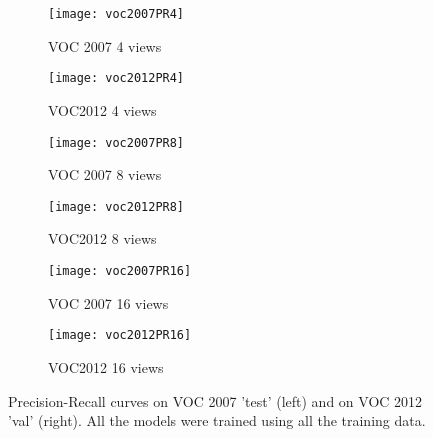 \begin{figure}
\begin{center}
        \begin{subfigure}[b]{0.49\textwidth}
                \texttt{[image: voc2007PR4]}
               	\caption{VOC 2007 4 views}
        \end{subfigure}
        \begin{subfigure}[b]{0.49\textwidth}
                \texttt{[image: voc2012PR4]}
                \caption{VOC2012 4 views}
        \end{subfigure}
        \begin{subfigure}[b]{0.49\textwidth}
                \texttt{[image: voc2007PR8]}
               	\caption{VOC 2007 8 views}
        \end{subfigure}
        \begin{subfigure}[b]{0.49\textwidth}
                \texttt{[image: voc2012PR8]}
                \caption{VOC2012 8 views}
        \end{subfigure}
        \begin{subfigure}[b]{0.49\textwidth}
                \texttt{[image: voc2007PR16]}
               	\caption{VOC 2007 16 views}
        \end{subfigure}
        \begin{subfigure}[b]{0.49\textwidth}
                \texttt{[image: voc2012PR16]}
                \caption{VOC2012 16 views}
        \end{subfigure}        
\caption{Precision-Recall curves on VOC 2007 'test' (left) and on VOC 2012 'val' (right).  All the models were trained using all the training data.  }
\label{fig:PRVOC}
\end{center}
\end{figure}

